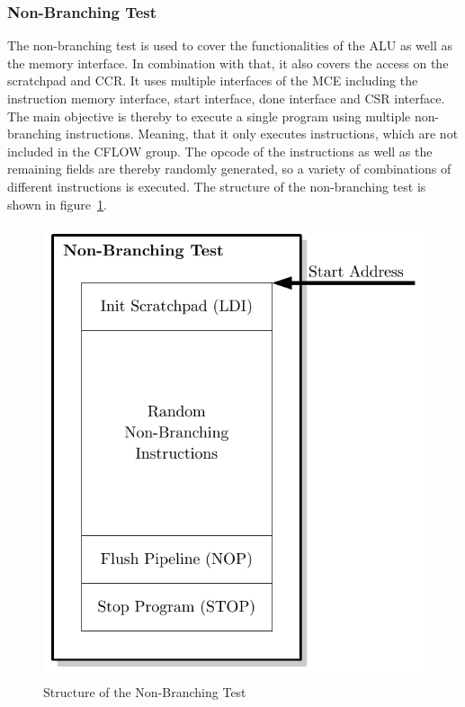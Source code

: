 \subsubsection{Non-Branching Test}

The non-branching test is used to cover the functionalities of the ALU as well as the memory interface.
In combination with that, it also covers the access on the scratchpad and CCR.
It uses multiple interfaces of the MCE including the instruction memory interface, start interface, done interface and CSR interface.
The main objective is thereby to execute a single program using multiple non-branching instructions.
Meaning, that it only executes instructions, which are not included in the CFLOW group.
The opcode of the instructions as well as the remaining fields are thereby randomly generated, so a variety of combinations of different instructions is
executed.
The structure of the non-branching test is shown in figure~\ref{fig:non_branching_test}.

\begin{figure}[htb]
 \centering
 \includegraphics[scale=1.0]{images/non_branching_test}
 \caption{Structure of the Non-Branching Test}
\label{fig:non_branching_test}
\end{figure}

